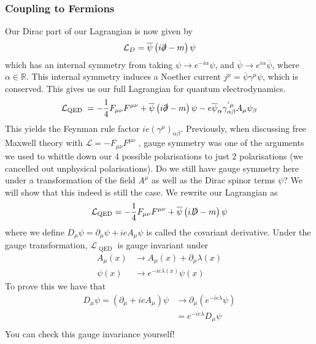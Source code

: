 \subsubsection{Coupling to Fermions} 
Our Dirac part of our Lagrangian 
is now given by 
\[
	\mathcal{ L } _ D = \overline{ \psi } \left( i \slashed{\partial} -m  \right) \psi 
\] which has an internal symmetry from taking $ \psi \to e ^{ - i \alpha } \psi $, 
and $ \overline{\psi } \to e ^{ i \alpha } \overline{ \psi } $, 
where $ \alpha \in \mathbb{  R} $. This internal symmetry 
induces a Noether current $ j ^ \mu  = \overline{\psi } \gamma ^ \mu \psi $, 
which is conserved. 
This gives us our full Lagrangian for quantum electrodynamics. 
\[
 \mathcal{ L } _{ \text{QED } }  = -\frac{1}{4 } F_{ \mu \nu } F ^{ \mu \nu } + 
 \overline{ \psi } \left( i \slashed{\partial} -m  \right)\psi  - e \overline{ \psi } 
 _ \alpha \gamma _{ \alpha \beta } ^{' \mu } A _ \mu \psi _ \beta 
\] This yields the Feynman rule factor $ i e \left( \gamma ^ \mu  \right)  _{ \alpha \beta } $. 
Previously, when discussing 
free Maxwell theory with $ \mathcal{ L }  = -  F_{ \mu \nu } F ^{ \mu \nu } $ , gauge symmetry was one of the arguments we 
used to whittle down our 4 possible polarisations 
to just 2 polarisations (we cancelled out unphysical polarisations). 
Do we still have gauge symmetry here under a transformation 
of the field $ A^ \mu  $ as well as the Dirac 
spinor terms $ \psi $? We will show 
that this indeed is still the case. 
We rewrite our Lagrangian as 
\[
 \mathcal{ L } _{ \text{QED} }  = - \frac{1}{4 } F _{ \mu \nu } F ^{ \mu \nu } 
 + \overline{ \psi } \left( i \slashed{D} - m   \right)  \psi 
\] where we define $ D_ \mu \psi  = \partial  _ \mu \psi + i e A _ \mu \psi  $ 
is called the covariant derivative.
Under the gauge transformation, $ \mathcal{ L } _{ \text{ QED } } $ 
is gauge invariant under 
\begin{align*}
	A _ \mu ( x ) & \to A _ \mu ( x ) + \partial  _ \mu \lambda ( x ) \\
	\psi ( x) & \to e ^{  - i e \lambda ( x) } \psi ( x) 
\end{align*}
To prove this we have that 
\begin{align*}
	D_ \mu \psi  = ( \partial  _ \mu + i e A _ \mu ) \psi & \to \partial  _ \mu ( 
	e^{ - i  e \lambda } \psi ) \\
	&=  e ^{ - i e \lambda }  D_ \mu \psi  \\
\end{align*}
You can check this gauge invariance yourself!

